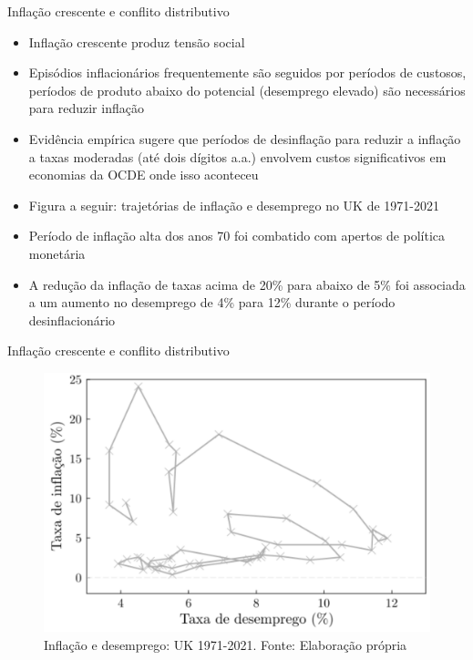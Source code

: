 \documentclass[10pt]{beamer}
\begin{document}
\begin{frame}
    {Inflação crescente e conflito distributivo}
    \begin{itemize}
        \item Inflação crescente produz tensão social\bigskip
        \item Episódios inflacionários frequentemente são seguidos por períodos de  custosos, períodos de produto abaixo do potencial (desemprego elevado) são necessários para reduzir inflação\bigskip
        \item Evidência empírica sugere que períodos de desinflação para reduzir a inflação a taxas moderadas (até dois dígitos a.a.) envolvem custos significativos em economias da OCDE onde isso aconteceu\bigskip
        \item Figura a seguir: trajetórias de inflação e desemprego no UK de 1971-2021\bigskip
        \item Período de inflação alta dos anos 70 foi combatido com apertos de política monetária\bigskip
        \item A redução da inflação de taxas acima de 20\% para abaixo de 5\% foi associada a um aumento no desemprego de 4\% para 12\% durante o período desinflacionário
    \end{itemize}
\end{frame}

\begin{frame}
    {Inflação crescente e conflito distributivo}
    \begin{figure}
        \includegraphics[width=.65\textwidth]{./figures/aula15_fig11.PNG}
        \caption{Inflação e desemprego: UK 1971-2021. Fonte: Elaboração própria}
    \end{figure}
\end{frame}
\end{document}
